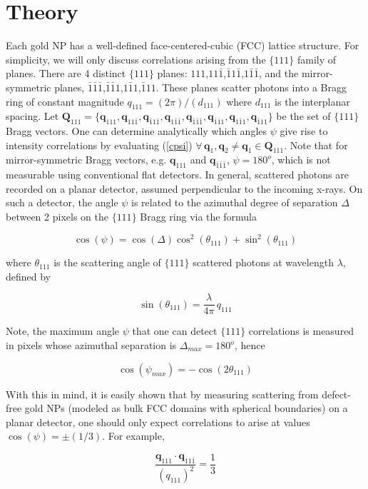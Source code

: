 \documentclass [11pt,fleqn]{article}
\def \be {\begin{equation}}
\def \ee {\end{equation}}
\begin{document}
\section{Theory}
Each gold NP has a well-defined face-centered-cubic (FCC) lattice structure. For simplicity, we will only discuss correlations arising from the $\{111\}$ family of planes. There are 4 distinct $\{111\}$ planes: $111$,$11\bar 1$,$\bar 1 1\bar 1$,$1\bar 1 \bar 1$, and the mirror-symmetric planes, $\bar 1\bar 1\bar 1$,$\bar 1\bar 1 1$,$1 \bar 11$,$\bar 1 1 1$.  These planes scatter photons into a Bragg ring of constant magnitude $q_{111} = ( 2\pi ) / ( d_{111} )$ where $d_{111}$ is the interplanar spacing.  Let $\bm Q_{111} = \{\bm q_{111}, \bm q_{11\bar 1},\bm q_{\bar 1 1\bar 1},\bm q_{1\bar 1 \bar 1},\bm q_{\bar 1\bar 1\bar 1},\bm q_{\bar 1\bar 1 1},\bm q_{1 \bar 11},\bm q_{\bar 1 1 1}\}$ be the set of $\{111\}$ Bragg vectors. One can determine analytically which angles $\psi$ give rise to intensity correlations by evaluating (\ref{cpsi}) $\forall \, \bm q_1, \bm q_2\ne \bm q_1 \in \bm Q_{111}$. Note that for mirror-symmetric Bragg vectors, e.g. $\bm q_{111}$ and $\bm q_{\bar 1\bar 1\bar 1}$,  $\psi = 180^o$, which is not measurable using conventional flat detectors. In general, scattered photons are recorded on a planar detector, assumed perpendicular to the incoming x-rays. On such a detector, the angle $\psi$ is related to the azimuthal degree of separation $\Delta$ between 2 pixels on the $\{111\}$ Bragg ring via the formula

\be \label{project}
\cos(\psi) = \cos( \Delta )\cos^2( \theta_{111}) + \sin^2(\theta_{111})
\ee

where $\theta_{111}$ is the scattering angle of $\{111\}$ scattered photons at wavelength $\lambda$, defined by

\be
\sin (\theta_{111})   = \frac{ \lambda  }{ 4\pi } \, q_{111}
\ee

Note, the maximum angle $\psi$ that one can detect $\{111\}$ correlations is measured in pixels whose azimuthal separation is $\Delta_{max}=180^o$, hence

\be \label{psimax}
\cos(\psi_{max}) = - \cos(2\theta_{111})
\ee

With this in mind, it is easily shown that by measuring scattering from defect-free gold NPs (modeled as bulk FCC domains with spherical boundaries) on a planar detector, one should only expect correlations to arise at values $\cos(\psi) = \pm (1/3)$. For example, 

\be \label{g1}
\frac{\bm q_{111} \cdot \bm q_{11\bar{1}}}{(q_{111})^2}  = \frac{1}{3}
\ee
\end{document}
